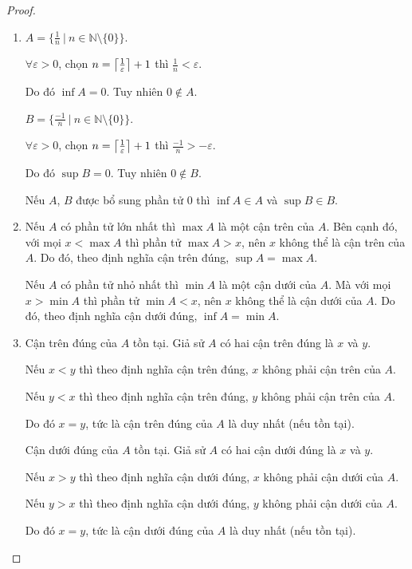 \documentclass[class=analysis,crop=false]{standalone}
\begin{document}
\begin{proof}
    \begin{enumerate}[label = (\roman*)]
        \item $A = \{ \frac{1}{n}\ |\ n\in\mathbb{N}\setminus\{ 0 \} \}$.
              \par $\forall\varepsilon > 0$, chọn $n = \left\lceil{\frac{1}{\varepsilon}}\right\rceil + 1$ thì $\frac{1}{n} < \varepsilon$.
              \par Do đó $\inf A = 0$. Tuy nhiên $0\not\in A$.
              \par $B = \{ \frac{-1}{n}\ |\ n\in\mathbb{N}\setminus\{ 0 \} \}$.
              \par $\forall\varepsilon > 0$, chọn $n = \left\lceil{\frac{1}{\varepsilon}}\right\rceil + 1$ thì $\frac{-1}{n} > -\varepsilon$.
              \par Do đó $\sup B = 0$. Tuy nhiên $0\not\in B$.
              \par Nếu $A$, $B$ được bổ sung phần tử $0$ thì $\inf A\in A$ và $\sup B\in B$.
        \item Nếu $A$ có phần tử lớn nhất thì $\max A$ là một cận trên của $A$. Bên cạnh đó, với mọi $x < \max A$ thì phần tử $\max A > x$, nên $x$ không thể là cận trên của $A$. Do đó, theo định nghĩa cận trên đúng, $\sup A = \max A$.
              \par Nếu $A$ có phần tử nhỏ nhất thì $\min A$ là một cận dưới của $A$. Mà với mọi $x > \min A$ thì phần tử $\min A < x$, nên $x$ không thể là cận dưới của $A$. Do đó, theo định nghĩa cận dưới đúng, $\inf A = \min A$.
        \item Cận trên đúng của $A$ tồn tại. Giả sử $A$ có hai cận trên đúng là $x$ và $y$.
              \par Nếu $x < y$ thì theo định nghĩa cận trên đúng, $x$ không phải cận trên của $A$.
              \par Nếu $y < x$ thì theo định nghĩa cận trên đúng, $y$ không phải cận trên của $A$.
              \par Do đó $x = y$, tức là cận trên đúng của $A$ là duy nhất (nếu tồn tại).
              \bigskip
              \par Cận dưới đúng của $A$ tồn tại. Giả sử $A$ có hai cận dưới đúng là $x$ và $y$.
              \par Nếu $x > y$ thì theo định nghĩa cận dưới đúng, $x$ không phải cận dưới của $A$.
              \par Nếu $y > x$ thì theo định nghĩa cận dưới đúng, $y$ không phải cận dưới của $A$.
              \par Do đó $x = y$, tức là cận dưới đúng của $A$ là duy nhất (nếu tồn tại).
    \end{enumerate}
\end{proof}
\end{document}
